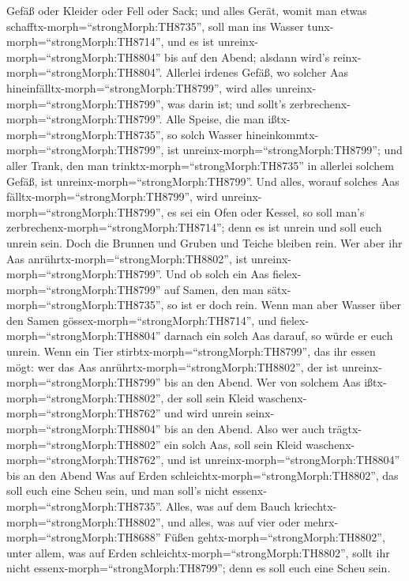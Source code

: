 Gefäß oder Kleider oder Fell oder Sack; und alles Gerät, womit man etwas
schafftx-morph=``strongMorph:TH8735'', soll man ins Wasser
tunx-morph=``strongMorph:TH8714'', und es ist
unreinx-morph=``strongMorph:TH8804'' bis auf den Abend; alsdann wird's
reinx-morph=``strongMorph:TH8804''.  Allerlei irdenes
Gefäß, wo solcher Aas hineinfälltx-morph=``strongMorph:TH8799'', wird
alles unreinx-morph=``strongMorph:TH8799'', was darin ist; und sollt's
zerbrechenx-morph=``strongMorph:TH8799''.  Alle Speise, die
man ißtx-morph=``strongMorph:TH8735'', so solch Wasser
hineinkommtx-morph=``strongMorph:TH8799'', ist
unreinx-morph=``strongMorph:TH8799''; und aller Trank, den man
trinktx-morph=``strongMorph:TH8735'' in allerlei solchem Gefäß, ist
unreinx-morph=``strongMorph:TH8799''.  Und alles, worauf
solches Aas fälltx-morph=``strongMorph:TH8799'', wird
unreinx-morph=``strongMorph:TH8799'', es sei ein Ofen oder Kessel, so
soll man's zerbrechenx-morph=``strongMorph:TH8714''; denn es ist unrein
und soll euch unrein sein.  Doch die Brunnen und Gruben und
Teiche bleiben rein. Wer aber ihr Aas
anrührtx-morph=``strongMorph:TH8802'', ist
unreinx-morph=``strongMorph:TH8799''.  Und ob solch ein Aas
fielex-morph=``strongMorph:TH8799'' auf Samen, den man
sätx-morph=``strongMorph:TH8735'', so ist er doch rein. 
Wenn man aber Wasser über den Samen gössex-morph=``strongMorph:TH8714'',
und fielex-morph=``strongMorph:TH8804'' darnach ein solch Aas darauf, so
würde er euch unrein.  Wenn ein Tier
stirbtx-morph=``strongMorph:TH8799'', das ihr essen mögt: wer das Aas
anrührtx-morph=``strongMorph:TH8802'', der ist
unreinx-morph=``strongMorph:TH8799'' bis an den Abend.  Wer
von solchem Aas ißtx-morph=``strongMorph:TH8802'', der soll sein Kleid
waschenx-morph=``strongMorph:TH8762'' und wird unrein
seinx-morph=``strongMorph:TH8804'' bis an den Abend. Also wer auch
trägtx-morph=``strongMorph:TH8802'' ein solch Aas, soll sein Kleid
waschenx-morph=``strongMorph:TH8762'', und ist
unreinx-morph=``strongMorph:TH8804'' bis an den Abend  Was
auf Erden schleichtx-morph=``strongMorph:TH8802'', das soll euch eine
Scheu sein, und man soll's nicht essenx-morph=``strongMorph:TH8735''.
 Alles, was auf dem Bauch
kriechtx-morph=``strongMorph:TH8802'', und alles, was auf vier oder
mehrx-morph=``strongMorph:TH8688'' Füßen
gehtx-morph=``strongMorph:TH8802'', unter allem, was auf Erden
schleichtx-morph=``strongMorph:TH8802'', sollt ihr nicht
essenx-morph=``strongMorph:TH8799''; denn es soll euch eine Scheu sein.
